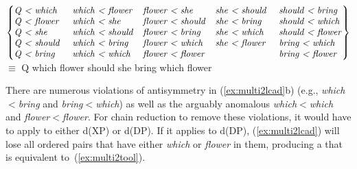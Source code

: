 \documentclass[output=paper]{langsci/langscibook}
\begin{document}
\begin{exe}
\begin{xlist}
		\ex
		\footnotesize
		$\left\{\begin{array}{@{}lllll@{}}
\text{\emph{Q < which  }} & \text{\emph{which < flower}} & \text{\emph{flower < she}}    & \text{\emph{she < should  }} & \text{\emph{should < bring}} \\%
\text{\emph{Q < flower }} & \text{\emph{which < she   }} & \text{\emph{flower < should}}  & \text{\emph{she < bring   }} & \text{\emph{should < which}} \\%
\text{\emph{Q < she    }} & \text{\emph{which < should}} & \text{\emph{flower < bring }} & \text{\emph{she < which   }} & \text{\emph{should < flower}} \\
\text{\emph{Q < should }} & \text{\emph{which < bring }} & \text{\emph{flower < which }} & \text{\emph{she < flower}} & \text{\emph{bring < which}} \\
\text{\emph{Q < bring  }} & \text{\emph{which < which }} & \text{\emph{flower < flower}} &                            &  \text{\emph{bring < flower}} \\
			\end{array}\right\}$\\[5pt]
		\normalsize
		$\equiv$ Q which flower should she bring which flower
	\end{xlist}
\end{exe}

There are numerous violations of antisymmetry in (\ref{ex:multi2lcad}b) (e.g.,
\emph{which$<$bring} and \emph{bring$<$which}) as well as the arguably anomalous
\emph{which$<$which} and \emph{flower$<$flower}. For chain reduction to remove
these violations, it would have to apply to either d(XP) or d(DP). If it
applies to d(DP), (\ref{ex:multi2lcad}) will lose all ordered pairs that have
either \emph{which} or \emph{flower} in them, producing a  that is
equivalent to~(\ref{ex:multi2tool}).
\end{document}
